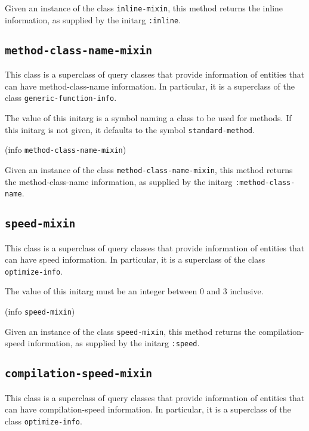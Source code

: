 Given an instance of the class \texttt{inline-mixin}, this method
returns the inline information, as supplied by the initarg
\texttt{:inline}.

\subsection{\texttt{method-class-name-mixin}}
\label{sec-method-class-name-mixin}

This class is a superclass of query classes that provide information
of entities that can have method-class-name information.  In
particular, it is a superclass of the class
\texttt{generic-function-info}.


The value of this initarg is a symbol naming a class to be used for
methods.  If this initarg is not given, it defaults to the symbol
\texttt{standard-method}.

 {(info {\tt method-class-name-mixin})}

Given an instance of the class \texttt{method-class-name-mixin}, this
method returns the method-class-name information, as supplied by the
initarg \texttt{:method-class-name}.

\subsection{\texttt{speed-mixin}}
\label{sec-speed-mixin}

This class is a superclass of query classes that provide information
of entities that can have speed information.  In particular, it is a
superclass of the class \texttt{optimize-info}.


The value of this initarg must be an integer between $0$ and $3$
inclusive.

 {(info {\tt speed-mixin})}

Given an instance of the class \texttt{speed-mixin}, this method
returns the compilation-speed information, as supplied by the initarg
\texttt{:speed}.

\subsection{\texttt{compilation-speed-mixin}}
\label{sec-compilation-speed-mixin}

This class is a superclass of query classes that provide information
of entities that can have compilation-speed information.  In particular, it is a
superclass of the class \texttt{optimize-info}.

